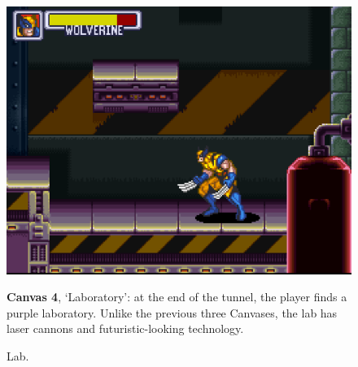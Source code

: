 \documentclass[english]{textolivre}
\begin{document}
\begin{figure}[htbp]
\begin{minipage}[t]{.47\textwidth}
\vspace{0pt}
\includegraphics[width=\textwidth]{fig-010.png}
\caption{Lab.}
\label{fig-010}
\end{minipage}
\hfill
\begin{minipage}[t]{.47\textwidth}
\vspace{2pt}
\textbf{Canvas 4}, ‘Laboratory’: at the end of the tunnel, the player finds a purple laboratory. Unlike the previous three Canvases, the lab has laser cannons and futuristic-looking technology.
\end{minipage}
\end{figure}
\end{document}
